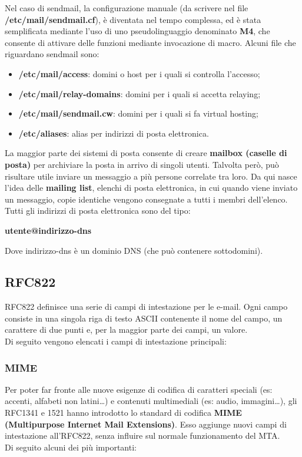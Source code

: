     Nel caso di sendmail, la configurazione manuale (da scrivere nel file \textbf{/etc/mail/sendmail.cf}), 
    è diventata nel tempo complessa, ed è stata semplificata mediante l’uso di uno pseudolinguaggio 
    denominato \textbf{M4}, che consente di attivare delle funzioni mediante invocazione di macro. 
    Alcuni file che riguardano sendmail sono:

    \begin{itemize}
        \item \textbf{/etc/mail/access}: domini o host per i quali si controlla l’accesso;
        \item \textbf{/etc/mail/relay-domains}: domini per i quali si accetta relaying;
        \item \textbf{/etc/mail/sendmail.cw}: domini per i quali si fa virtual hosting;
        \item \textbf{/etc/aliases}: alias per indirizzi di posta elettronica.
    \end{itemize}

    La maggior parte dei sistemi di posta consente di creare \textbf{mailbox (caselle di posta)} per
    archiviare la posta in arrivo di singoli utenti. Talvolta però, può risultare utile inviare un
    messaggio a più persone correlate tra loro. Da qui nasce l’idea delle \textbf{mailing list}, elenchi di
    posta elettronica, in cui quando viene inviato un messaggio, copie identiche vengono
    consegnate a tutti i membri dell’elenco. Tutti gli indirizzi di posta elettronica sono del tipo:

    \begin{center}
        \textbf{utente@indirizzo-dns}
    \end{center}

    Dove indirizzo-dns è un dominio DNS (che può contenere sottodomini).

    \subsection{RFC822}
        RFC822 definisce una serie di campi di intestazione per le e-mail. Ogni campo consiste in una
        singola riga di testo ASCII contenente il nome del campo, un carattere di due punti e, per la
        maggior parte dei campi, un valore.\\
        Di seguito vengono elencati i campi di intestazione principali:

        \subsubsection{MIME}
            Per poter far fronte alle nuove esigenze di codifica di caratteri speciali (es: accenti, alfabeti non
            latini…) e contenuti multimediali (es: audio, immagini…), gli RFC1341 e 1521 hanno introdotto
            lo standard di codifica \textbf{MIME (Multipurpose Internet Mail Extensions)}. Esso aggiunge nuovi
            campi di intestazione all’RFC822, senza influire sul normale funzionamento del MTA.\\
            Di seguito alcuni dei più importanti:

